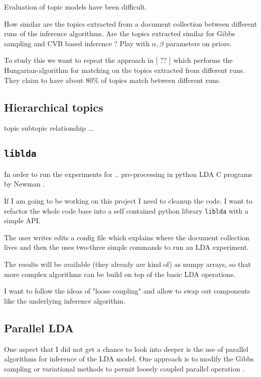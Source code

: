 \documentclass[letterpaper,12pt]{article}
\begin{document}
		Evaluation of topic models have been difficult. 
		\bigskip
		\bigskip
		
		How similar are the topics extracted from a document collection
		between different runs of the inference algorithms.
		Are the topics extracted similar for Gibbs sampling and CVB based
		inference ?
		Play with $\alpha, \beta$ parameters on priors.
		
		To study this we want to repeat the approach in [ $??$ ] which 
		performs the Hungarian-algorithm for matching on the topics 
		extracted from different runs.
		They claim to have about 80\% of topics match between different runs.
		
	\subsection{Hierarchical topics}
	
		topic subtopic relationship ...

	\subsection{\texttt{liblda}}
	
		In order to run the experiments for ..
		pre-processing in python 
		LDA C programs by Newman  \cite{NewmanCode}.
		
		If I am going to be working on this project I need to cleanup the code.
		I want to refactor the whole
		code base into a self contained python library \texttt{liblda} with a simple API.
		
	    
	    The user writes edits a config file which explains where the document collection lives
	    and then the uses two-three simple commands to run an LDA experiment.

	    The results will be available (they already are kind of) as numpy arrays, so that
	    more complex algorithms can be build on top of the basic LDA operations.

	    I want to follow the ideas of "loose coupling" and allow to swap out components like
	    the underlying inference algorithm.


	
		
	\subsection{Parallel LDA}

	        One aspect that I did not get a chance to look into deeper is the use of parallel algorithms
	        for inference of the LDA model.
	        One approach is to modify the Gibbs sampling or variational methods to permit loosely
	        coupled parallel operation \cite{newman2006scalable,newman2007distributed}. 
\end{document}
